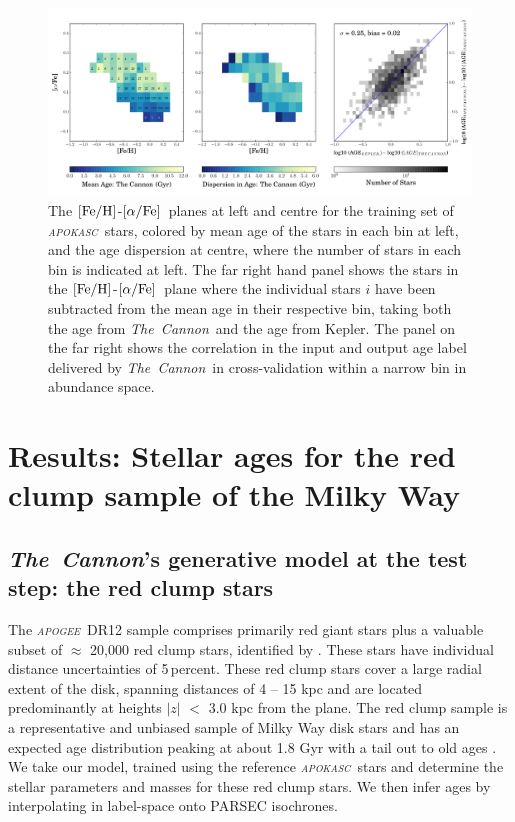 \documentclass[12pt, preprint]{aastex}
\newcommand{\project}[1]{\textsl{#1}}
\newcommand{\tc}{\project{The~Cannon}}
\newcommand{\apogee}{\project{\textsc{apogee}}}
\newcommand{\apokasc}{\project{\textsc{apokasc}}}
\newcommand{\feh}{\mbox{$\rm [Fe/H]$}}
\newcommand{\alphafe}{\mbox{$\rm [\alpha/Fe]$}}
\begin{document}
\begin{figure}[p]
\centering
  \includegraphics[scale=0.4]{./plots/alpha_feh_rc2.pdf}
    \caption{The \feh-\alphafe\ planes at left and centre for the training set of \apokasc\ stars, colored by mean age of the stars in each bin at left,  and the age dispersion at centre, where the number of stars in each bin is indicated at left. The far right hand panel shows the stars in the \feh-\alphafe\ plane where the individual stars $i$ have been subtracted from the mean age in their respective bin, taking both the age from \tc\ and the age from Kepler. The panel on the far right shows the correlation in the input and output age label delivered by \tc\ in cross-validation within a narrow bin in abundance space.  }
\label{fig:alphabins}
\end{figure}

\section{Results: Stellar ages for the red clump sample of the Milky Way}

\subsection{\tc's generative model at the test step: the red clump stars}

The \apogee\ DR12 sample comprises primarily red giant stars plus a valuable subset of  $\approx$ 20,000 red clump stars, identified by \citet{Bovy2014}.  These stars have individual distance uncertainties of 5\,percent. These red clump stars cover a large radial extent of the disk, spanning distances of 4 -- 15 kpc and are located predominantly at heights $|z|$ $<$ 3.0 kpc from the plane. The red clump sample is a representative and unbiased sample of Milky Way disk stars and has an expected age distribution peaking at about 1.8 Gyr with a tail out to old ages \citep[see Figure 15 of][]{Bovy2014}. We take our model, trained using the reference \apokasc\ stars and determine the stellar parameters and masses for these red clump stars. We then infer ages by interpolating in label-space onto PARSEC isochrones.
\end{document}
